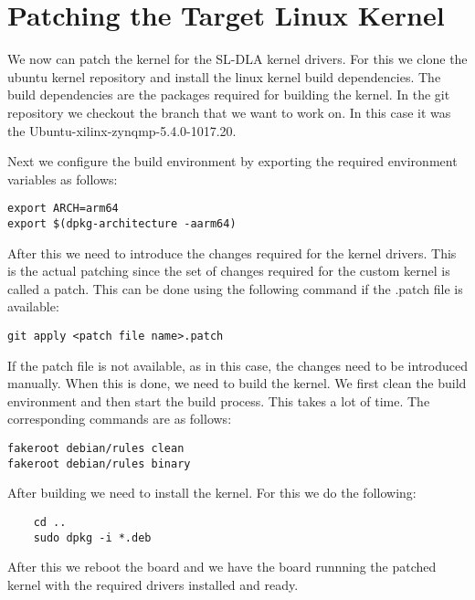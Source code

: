 \documentclass{article}
\begin{document}
\section{Patching the Target Linux Kernel}
We now can patch the kernel for the SL-DLA kernel drivers. For this we clone the ubuntu kernel repository and
install the linux kernel build dependencies. The build dependencies are the packages required for building the kernel.
In the git repository we checkout the branch that we want to work on. In this case it was the
Ubuntu-xilinx-zynqmp-5.4.0-1017.20.

\medbreak{}

Next we configure the build environment by exporting the required environment variables as follows:
\begin{lstlisting}
export ARCH=arm64
export $(dpkg-architecture -aarm64)
\end{lstlisting}

After this we need to introduce the changes required for the kernel drivers. This is the actual patching since
the set of changes required for the custom kernel is called a patch. This can be done using the following command
if the .patch file is available:
\begin{lstlisting}
git apply <patch file name>.patch
\end{lstlisting}

If the patch file is not available, as in this case, the changes need to be introduced manually. When this is done,
we need to build the kernel. We first clean the build environment and then start the build process. This takes
a lot of time. The corresponding commands are as follows:
\begin{lstlisting}
fakeroot debian/rules clean
fakeroot debian/rules binary
\end{lstlisting}

After building we need to install the kernel. For this we do the following:
\begin{lstlisting}
    cd ..
    sudo dpkg -i *.deb
\end{lstlisting}

After this we reboot the board and we have the board runnning the patched kernel with the required drivers
installed and ready.
\end{document}
